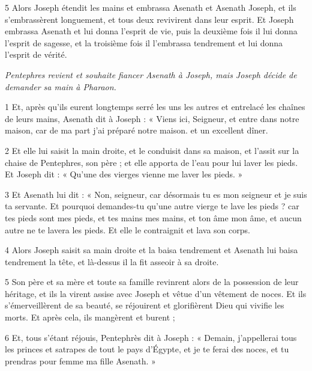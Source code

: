 \par 5 Alors Joseph étendit les mains et embrassa Asenath et Asenath Joseph, et ils s'embrassèrent longuement, et tous deux revivirent dans leur esprit. Et Joseph embrassa Asenath et lui donna l'esprit de vie, puis la deuxième fois il lui donna l'esprit de sagesse, et la troisième fois il l'embrassa tendrement et lui donna l'esprit de vérité.


\par \textit{Pentephres revient et souhaite fiancer Asenath à Joseph, mais Joseph décide de demander sa main à Pharaon.}

\par 1 Et, après qu'ils eurent longtemps serré les uns les autres et entrelacé les chaînes de leurs mains, Asenath dit à Joseph : « Viens ici, Seigneur, et entre dans notre maison, car de ma part j'ai préparé notre maison. et un excellent dîner.

\par 2 Et elle lui saisit la main droite, et le conduisit dans sa maison, et l'assit sur la chaise de Pentephres, son père ; et elle apporta de l'eau pour lui laver les pieds. Et Joseph dit : « Qu’une des vierges vienne me laver les pieds. »

\par 3 Et Asenath lui dit : « Non, seigneur, car désormais tu es mon seigneur et je suis ta servante. Et pourquoi demandes-tu qu’une autre vierge te lave les pieds ? car tes pieds sont mes pieds, et tes mains mes mains, et ton âme mon âme, et aucun autre ne te lavera les pieds. Et elle le contraignit et lava son corps.

\par 4 Alors Joseph saisit sa main droite et la baisa tendrement et Asenath lui baisa tendrement la tête, et là-dessus il la fit asseoir à sa droite.

\par 5 Son père et sa mère et toute sa famille revinrent alors de la possession de leur héritage, et ils la virent assise avec Joseph et vêtue d'un vêtement de noces. Et ils s'émerveillèrent de sa beauté, se réjouirent et glorifièrent Dieu qui vivifie les morts. Et après cela, ils mangèrent et burent ;

\par 6 Et, tous s'étant réjouis, Pentephrès dit à Joseph : « Demain, j'appellerai tous les princes et satrapes de tout le pays d'Égypte, et je te ferai des noces, et tu prendras pour femme ma fille Asenath. »

